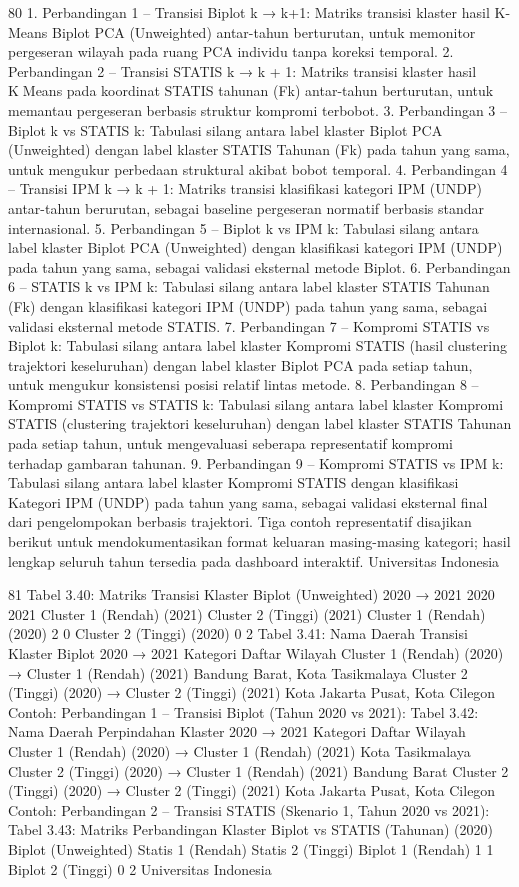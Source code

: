 80
1. Perbandingan 1 – Transisi Biplot k → k+1: Matriks transisi klaster hasil K-Means
Biplot PCA (Unweighted) antar-tahun berturutan, untuk memonitor pergeseran
wilayah pada ruang PCA individu tanpa koreksi temporal.
2. Perbandingan 2 – Transisi STATIS k → k + 1: Matriks transisi klaster hasil KMeans pada koordinat STATIS tahunan (Fk) antar-tahun berturutan, untuk memantau
pergeseran berbasis struktur kompromi terbobot.
3. Perbandingan 3 – Biplot k vs STATIS k: Tabulasi silang antara label klaster Biplot
PCA (Unweighted) dengan label klaster STATIS Tahunan (Fk) pada tahun yang
sama, untuk mengukur perbedaan struktural akibat bobot temporal.
4. Perbandingan 4 – Transisi IPM k → k + 1: Matriks transisi klasifikasi kategori
IPM (UNDP) antar-tahun berurutan, sebagai baseline pergeseran normatif berbasis
standar internasional.
5. Perbandingan 5 – Biplot k vs IPM k: Tabulasi silang antara label klaster Biplot
PCA (Unweighted) dengan klasifikasi kategori IPM (UNDP) pada tahun yang sama,
sebagai validasi eksternal metode Biplot.
6. Perbandingan 6 – STATIS k vs IPM k: Tabulasi silang antara label klaster STATIS
Tahunan (Fk) dengan klasifikasi kategori IPM (UNDP) pada tahun yang sama,
sebagai validasi eksternal metode STATIS.
7. Perbandingan 7 – Kompromi STATIS vs Biplot k: Tabulasi silang antara label
klaster Kompromi STATIS (hasil clustering trajektori keseluruhan) dengan label
klaster Biplot PCA pada setiap tahun, untuk mengukur konsistensi posisi relatif
lintas metode.
8. Perbandingan 8 – Kompromi STATIS vs STATIS k: Tabulasi silang antara label
klaster Kompromi STATIS (clustering trajektori keseluruhan) dengan label klaster
STATIS Tahunan pada setiap tahun, untuk mengevaluasi seberapa representatif
kompromi terhadap gambaran tahunan.
9. Perbandingan 9 – Kompromi STATIS vs IPM k: Tabulasi silang antara label
klaster Kompromi STATIS dengan klasifikasi Kategori IPM (UNDP) pada tahun
yang sama, sebagai validasi eksternal final dari pengelompokan berbasis trajektori.
Tiga contoh representatif disajikan berikut untuk mendokumentasikan format keluaran
masing-masing kategori; hasil lengkap seluruh tahun tersedia pada dashboard interaktif.
Universitas Indonesia

81
Tabel 3.40: Matriks Transisi Klaster Biplot (Unweighted) 2020 → 2021
2020
2021 Cluster 1 (Rendah) (2021) Cluster 2 (Tinggi) (2021)
Cluster 1 (Rendah) (2020) 2 0
Cluster 2 (Tinggi) (2020) 0 2
Tabel 3.41: Nama Daerah Transisi Klaster Biplot 2020 → 2021
Kategori Daftar Wilayah
Cluster 1 (Rendah)
(2020) → Cluster 1
(Rendah) (2021)
Bandung Barat, Kota Tasikmalaya
Cluster 2 (Tinggi)
(2020) → Cluster 2
(Tinggi) (2021)
Kota Jakarta Pusat, Kota Cilegon
Contoh: Perbandingan 1 – Transisi Biplot (Tahun 2020 vs 2021):
Tabel 3.42: Nama Daerah Perpindahan Klaster 2020 → 2021
Kategori Daftar Wilayah
Cluster 1 (Rendah)
(2020) → Cluster 1
(Rendah) (2021)
Kota Tasikmalaya
Cluster 2 (Tinggi)
(2020) → Cluster 1
(Rendah) (2021)
Bandung Barat
Cluster 2 (Tinggi)
(2020) → Cluster 2
(Tinggi) (2021)
Kota Jakarta Pusat, Kota Cilegon
Contoh: Perbandingan 2 – Transisi STATIS (Skenario 1, Tahun 2020 vs 2021):
Tabel 3.43: Matriks Perbandingan Klaster Biplot vs STATIS (Tahunan) (2020)
Biplot (Unweighted) Statis 1 (Rendah) Statis 2 (Tinggi)
Biplot 1 (Rendah) 1 1
Biplot 2 (Tinggi) 0 2
Universitas Indonesia

